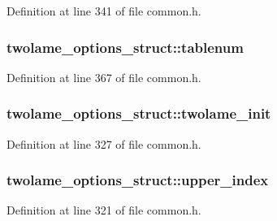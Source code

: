 Definition at line 341 of file common.\+h.

\subsubsection[{\texorpdfstring{tablenum}{tablenum}}]{ twolame\+\_\+options\+\_\+struct\+::tablenum}\hypertarget{structtwolame__options__struct_a619758b697006462f7c89fc0a7330cc8}{}\label{structtwolame__options__struct_a619758b697006462f7c89fc0a7330cc8}


Definition at line 367 of file common.\+h.

\subsubsection[{\texorpdfstring{twolame\+\_\+init}{twolame_init}}]{ twolame\+\_\+options\+\_\+struct\+::twolame\+\_\+init}\hypertarget{structtwolame__options__struct_a205bb93e39b37ed46fddf5bbca9fdfc4}{}\label{structtwolame__options__struct_a205bb93e39b37ed46fddf5bbca9fdfc4}


Definition at line 327 of file common.\+h.

\subsubsection[{\texorpdfstring{upper\+\_\+index}{upper_index}}]{ twolame\+\_\+options\+\_\+struct\+::upper\+\_\+index}\hypertarget{structtwolame__options__struct_a3293ab3beb5d4c271bff53daf556cd9a}{}\label{structtwolame__options__struct_a3293ab3beb5d4c271bff53daf556cd9a}


Definition at line 321 of file common.\+h.

